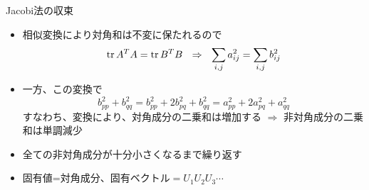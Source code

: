 \begin{frame}[t,fragile]{Jacobi法の収束}
  \begin{itemize}
    \setlength{\itemsep}{1em}
  \item 相似変換により対角和は不変に保たれるので
    \[
      {\rm tr} \, A^T A = {\rm tr} \, B^T B \ \ \Rightarrow \ \
      \sum_{i,j} a_{ij}^2 = \sum_{i,j} b_{ij}^2
    \]
  \item 一方、この変換で
    \[
    b_{pp}^2 + b_{qq}^2 = b_{pp}^2 + 2 b_{pq}^2 + b_{qq}^2 = a_{pp}^2 + 2 a_{pq}^2 + a_{qq}^2
    \]
    すなわち、変換により、対角成分の二乗和は増加する $\Rightarrow$ 非対角成分の二乗和は単調減少
  \item 全ての非対角成分が十分小さくなるまで繰り返す
  \item 固有値=対角成分、固有ベクトル$=U_1 U_2 U_3 \cdots$
  \end{itemize}
\end{frame}
